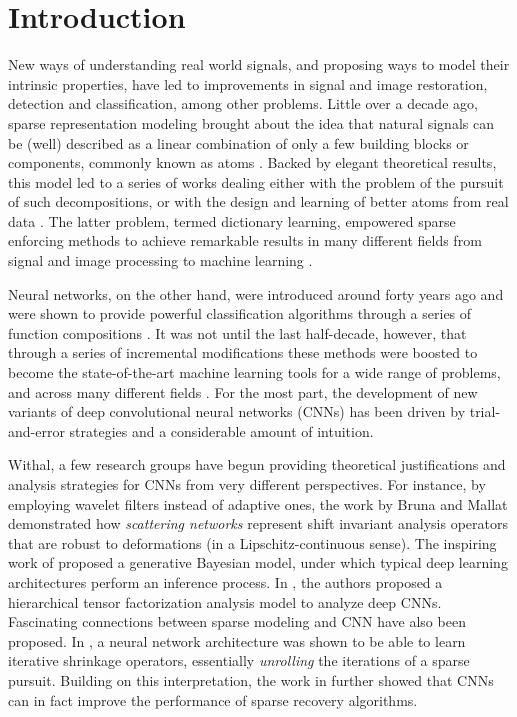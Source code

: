 \documentclass[10pt,journal]{IEEEtran}
\theoremstyle{plain}
\theoremstyle{definition}
\begin{document}
\IEEEdisplaynontitleabstractindextext

\IEEEpeerreviewmaketitle



\section{Introduction}

New ways of understanding real world signals, and proposing ways to model their intrinsic properties, have led to improvements in signal and image restoration, detection and classification, among other problems. Little over a decade ago, sparse representation modeling brought about the idea that natural signals can be (well) described as a linear combination of only a few building blocks or components, commonly known as atoms \cite{Bruckstein2009}. Backed by elegant theoretical results, this model led to a series of works dealing either with the problem of the pursuit of such decompositions, or with the design and learning of better atoms from real data \cite{Rubinstein2010_dict}. The latter problem, termed dictionary learning, empowered sparse enforcing methods to achieve remarkable results in many different fields from signal and image processing \cite{Sulam2014,Romano2014,Mairal2009} to machine learning \cite{Jiang2013,patel2014dictionaries,shrivastava2014multiple}.

Neural networks, on the other hand, were introduced around forty years ago and were shown to provide powerful classification algorithms through a series of function compositions \cite{lecun1990handwritten,rumelhart1988learning}.  It was not until the last half-decade, however, that through a series of incremental modifications these methods were boosted to become the state-of-the-art machine learning tools for a wide range of problems, and across many different fields \cite{lecun2015deep}. For the most part, the development of new variants of deep convolutional neural networks (CNNs) has been driven by trial-and-error strategies and a considerable amount of intuition. 

Withal, a few research groups have begun providing theoretical justifications and analysis strategies for CNNs from very different perspectives. For instance, by employing wavelet filters instead of adaptive ones, the work by Bruna and Mallat \cite{bruna2013invariant} demonstrated how \emph{scattering networks} represent shift invariant analysis operators that are robust to deformations (in a Lipschitz-continuous sense). The inspiring work of \cite{patel2015probabilistic} proposed a generative Bayesian model, under which typical deep learning architectures perform an inference process. In \cite{cohen16Shashua}, the authors proposed a hierarchical tensor factorization analysis model to analyze deep CNNs. Fascinating connections between sparse modeling and CNN have also been proposed. In \cite{gregor2010learning}, a neural network architecture was shown to be able to learn iterative shrinkage operators, essentially \emph{unrolling} the iterations of a sparse pursuit. Building on this interpretation, the work in \cite{xin2016maximal} further showed that CNNs can in fact improve the performance of sparse recovery algorithms. 
\end{document}
